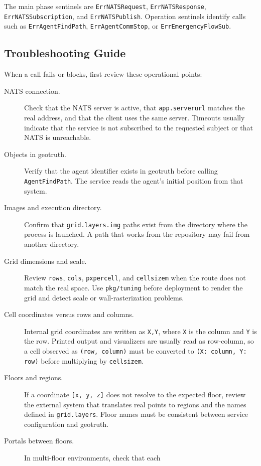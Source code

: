 \documentclass[12pt,a4paper]{report}
\begin{document}
The main phase sentinels are \texttt{ErrNATSRequest},
\texttt{ErrNATSResponse}, \texttt{ErrNATSSubscription}, and
\texttt{ErrNATSPublish}. Operation sentinels identify calls such as
\texttt{ErrAgentFindPath}, \texttt{ErrAgentCommStop}, or
\texttt{ErrEmergencyFlowSub}.

\subsection{Troubleshooting Guide}

When a call fails or blocks, first review these operational points:

\begin{description}
\item[NATS connection.] Check that the NATS server is active, that
\texttt{app.serverurl} matches the real address, and that the client uses the
same server. Timeouts usually indicate that the service is not subscribed to the
requested subject or that NATS is unreachable.
\item[Objects in geotruth.] Verify that the agent identifier exists in geotruth
before calling \texttt{AgentFindPath}. The service reads the agent's initial
position from that system.
\item[Images and execution directory.] Confirm that \texttt{grid.layers.img}
paths exist from the directory where the process is launched. A path that works
from the repository may fail from another directory.
\item[Grid dimensions and scale.] Review \texttt{rows}, \texttt{cols},
\texttt{pxpercell}, and \texttt{cellsizem} when the route does not match the
real space. Use \texttt{pkg/tuning} before deployment to render the grid and
detect scale or wall-rasterization problems.
\item[Cell coordinates versus rows and columns.] Internal grid coordinates are
written as \texttt{X,Y}, where \texttt{X} is the column and \texttt{Y} is the
row. Printed output and visualizers are usually read as row-column, so a cell
observed as \texttt{(row, column)} must be converted to
\texttt{(X: column, Y: row)} before multiplying by \texttt{cellsizem}.
\item[Floors and regions.] If a coordinate \texttt{[x, y, z]} does not resolve
to the expected floor, review the external system that translates real points
to regions and the names defined in \texttt{grid.layers}. Floor names must be
consistent between service configuration and geotruth.
\item[Portals between floors.] In multi-floor environments, check that each

\end{description}
\end{document}

